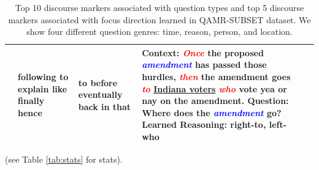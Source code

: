 \begin{table}[t]
{\begin{tabular}{|p{2cm}|p{4cm}|p{1.5cm}|p{1.5cm}|p{6cm}|}
	 & following \newline to explain \newline like \newline finally \newline hence & to \newline before \newline eventually \newline back \newline in that
  & \textbf{Context: }\textit{\textcolor{red}{Once}} the proposed \textit{\textcolor{blue}{amendment}} has passed those hurdles, \textit{\textcolor{red}{then}} the amendment goes \textit{\textcolor{red}{to}} \underline{Indiana voters} \textit{\textcolor{red}{who}} vote yea or nay on the amendment. 
  \newline \textbf{Question: }Where does the \textit{\textcolor{blue}{amendment}} go?
  \newline \textbf{Learned Reasoning: }right-to, left-who\\ 
 \hline
\end{tabular}
}
\caption{\fontsize{9}{12}\selectfont Top 10 discourse markers associated with question types and top 5 discourse markers associated with focus direction learned in \textsc{QAMR-SUBSET} dataset. We show four different question genres: time, reason, person, and location.}
\label{tab:disc_phrase}
\vspace{-0.5em}
\end{table}


(see Table \ref{tab:stats} for stats).
\begin{table}[h]
\caption{\fontsize{10}{12}\selectfont  Statistics of the datasets.}\label{tab:stats}
\end{table}


